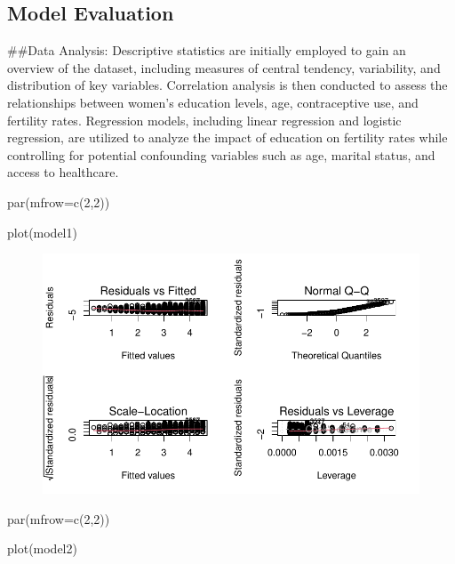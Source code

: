 \documentclass[
  letterpaper,
  DIV=11,
  numbers=noendperiod]{scrartcl}
\newenvironment{Shaded}{\begin{snugshade}}{\end{snugshade}}
\newcommand{\AttributeTok}[1]{\textcolor[rgb]{0.40,0.45,0.13}{#1}}
\newcommand{\DecValTok}[1]{\textcolor[rgb]{0.68,0.00,0.00}{#1}}
\newcommand{\FunctionTok}[1]{\textcolor[rgb]{0.28,0.35,0.67}{#1}}
\newcommand{\NormalTok}[1]{\textcolor[rgb]{0.00,0.23,0.31}{#1}}
\begin{document}
\hypertarget{model-evaluation}{%
\subsection{Model Evaluation}\label{model-evaluation}}

\#\#Data Analysis: Descriptive statistics are initially employed to gain
an overview of the dataset, including measures of central tendency,
variability, and distribution of key variables. Correlation analysis is
then conducted to assess the relationships between women's education
levels, age, contraceptive use, and fertility rates. Regression models,
including linear regression and logistic regression, are utilized to
analyze the impact of education on fertility rates while controlling for
potential confounding variables such as age, marital status, and access
to healthcare.

\begin{Shaded}
\begin{Highlighting}[]
\FunctionTok{par}\NormalTok{(}\AttributeTok{mfrow=}\FunctionTok{c}\NormalTok{(}\DecValTok{2}\NormalTok{,}\DecValTok{2}\NormalTok{)) }

\FunctionTok{plot}\NormalTok{(model1)}
\end{Highlighting}
\end{Shaded}

\begin{figure}[H]

{\centering \includegraphics{Fertility_Rates_Education_Impact_Botswana_files/figure-pdf/unnamed-chunk-45-1.pdf}

}

\end{figure}

\begin{Shaded}
\begin{Highlighting}[]
\FunctionTok{par}\NormalTok{(}\AttributeTok{mfrow=}\FunctionTok{c}\NormalTok{(}\DecValTok{2}\NormalTok{,}\DecValTok{2}\NormalTok{)) }

\FunctionTok{plot}\NormalTok{(model2)}
\end{Highlighting}
\end{Shaded}
\end{document}
